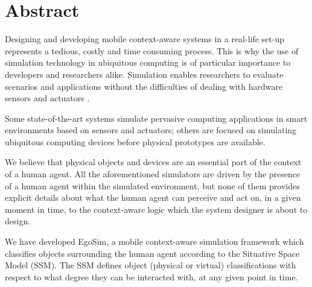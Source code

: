 \begingroup
\let\clearpage\relax
\let\cleardoublepage\relax
\let\cleardoublepage\relax

\chapter*{Abstract}
Designing and developing mobile context-aware systems in a real-life set-up represents a tedious, costly and time consuming process. This is why the use of simulation technology in ubiquitous computing is of particular importance to developers and researchers alike. Simulation enables researchers to evaluate scenarios and applications
without the difficulties of dealing with hardware sensors and actuators \cite{reynolds2006requirements}.

Some state-of-the-art systems simulate pervasive computing applications in smart environments based on sensors and actuators; others are focused on simulating ubiquitous computing devices before physical prototypes are available.


We believe that physical objects and devices are an essential part of the context of a human agent. All the aforementioned simulators are driven by the presence of a human agent within the simulated environment, but none of them provides explicit details about what the human agent can perceive and act on, in a given moment in time, to the context-aware logic which the system designer is about to design.


We have developed EgoSim, a mobile context-aware simulation framework which classifies objects surrounding the human agent according to the Situative Space Model (SSM). The SSM defines object (physical or virtual) classifications with respect to what degree they can be interacted with, at any given point in time.

